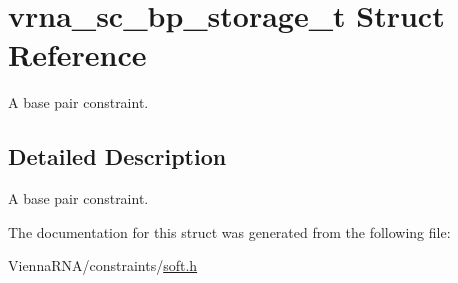 \hypertarget{structvrna__sc__bp__storage__t}{}\section{vrna\+\_\+sc\+\_\+bp\+\_\+storage\+\_\+t Struct Reference}
\label{structvrna__sc__bp__storage__t}


A base pair constraint.  




\subsection{Detailed Description}
A base pair constraint. 

The documentation for this struct was generated from the following file\+:\begin{DoxyCompactItemize}
\item 
Vienna\+R\+N\+A/constraints/\mbox{\hyperlink{soft_8h}{soft.\+h}}\end{DoxyCompactItemize}
